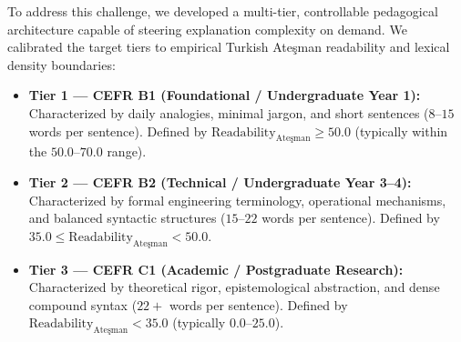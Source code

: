 \documentclass[a4paper,12pt]{report}
\begin{document}
To address this challenge, we developed a multi-tier, controllable pedagogical architecture capable of steering explanation complexity on demand. We calibrated the target tiers to empirical Turkish Ate\c{s}man readability and lexical density boundaries:
\begin{itemize}
    \item \textbf{Tier 1 --- CEFR B1 (Foundational / Undergraduate Year 1):} Characterized by daily analogies, minimal jargon, and short sentences ($8$--$15$ words per sentence). Defined by $\text{Readability}_{\text{Ate\c{s}man}} \ge 50.0$ (typically within the $50.0$--$70.0$ range).
    \item \textbf{Tier 2 --- CEFR B2 (Technical / Undergraduate Year 3--4):} Characterized by formal engineering terminology, operational mechanisms, and balanced syntactic structures ($15$--$22$ words per sentence). Defined by $35.0 \le \text{Readability}_{\text{Ate\c{s}man}} < 50.0$.
    \item \textbf{Tier 3 --- CEFR C1 (Academic / Postgraduate Research):} Characterized by theoretical rigor, epistemological abstraction, and dense compound syntax ($22+$ words per sentence). Defined by $\text{Readability}_{\text{Ate\c{s}man}} < 35.0$ (typically $0.0$--$25.0$).
\end{itemize}
\end{document}
